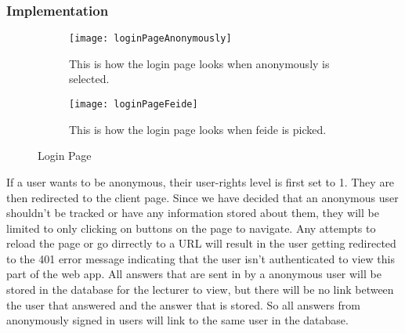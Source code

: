 \subsubsection{Implementation}
\begin{figure}[H]
    \centering
    \begin{subfigure}{0.45\linewidth}
        \texttt{[image: loginPageAnonymously]}
        \caption{This is how the login page looks when anonymously is selected.}
        \label{fig:loginPageAnonoumsly}
    \end{subfigure}
    \begin{subfigure}{0.45\linewidth}
        \texttt{[image: loginPageFeide]}
        \caption{This is how the login page looks when feide is picked.}
        \label{fig:loginPageFeide}
    \end{subfigure}
    \caption{Login Page}
    \label{fig:loginPage}
\end{figure}
\noindent
If a user wants to be anonymous,\cite[][]{VUE:DOC} their user-rights level is first set to 1. They are then redirected to the client page. Since we have decided that an anonymous user shouldn't be tracked or have any information stored about them, they will be limited to only clicking on buttons on the page to navigate. Any attempts to reload the page or go dirrectly to a URL will result in the user getting redirected to the 401 error message indicating that the user isn't authenticated to view this part of the web app. All answers that are sent in by a anonymous user will be stored in the database for the lecturer to view, but there will be no link between the user that answered and the answer that is stored. So all answers from anonymously signed in users will link to the same user in the database.
\\[11pt]
